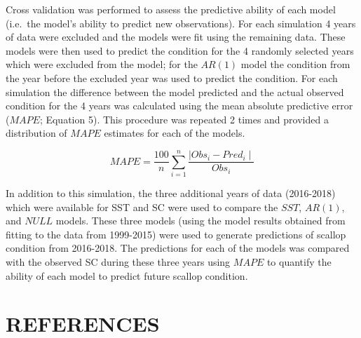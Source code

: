 \documentclass[
]{article}
\begin{document}
Cross validation was performed to assess the predictive ability of each model (i.e.~the model's ability to predict new observations). For each simulation 4 years of data were excluded and the models were fit using the remaining data. These models were then used to predict the condition for the 4 randomly selected years which were excluded from the model; for the \(AR(1)\) model the condition from the year before the excluded year was used to predict the condition. For each simulation the difference between the model predicted and the actual observed condition for the 4 years was calculated using the mean absolute predictive error (\(MAPE\); Equation 5). This procedure was repeated 2 times and provided a distribution of \(MAPE\) estimates for each of the models.

\begin{equation} MAPE = \frac{100}{n}\sum_{i=1}^{n} \frac{\mid Obs_i - Pred_i \mid }{Obs_i} \end{equation}

In addition to this simulation, the three additional years of data (2016-2018) which were available for SST and SC were used to compare the \(SST\), \(AR(1)\), and \(NULL\) models. These three models (using the model results obtained from fitting to the data from 1999-2015) were used to generate predictions of scallop condition from 2016-2018. The predictions for each of the models was compared with the observed SC during these three years using \(MAPE\) to quantify the ability of each model to predict future scallop condition.

\newpage

\hypertarget{references}{%
\section*{REFERENCES}\label{references}}
\end{document}
